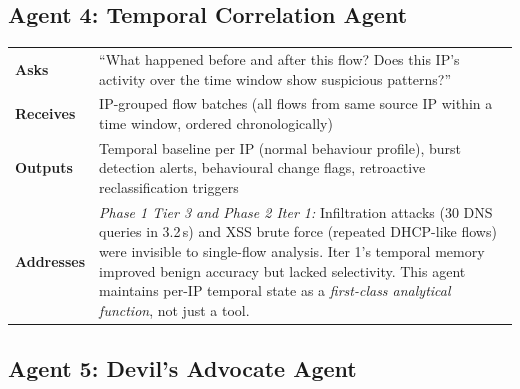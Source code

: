 \documentclass[12pt, a4paper, oneside]{report}
\begin{document}
\subsection{Agent 4: Temporal Correlation Agent}

\begin{table}[H]
\centering
\begin{tabular}{@{}lp{10cm}@{}}
\toprule
\textbf{Asks}     & ``What happened before and after this flow? Does this IP's
                     activity over the time window show suspicious patterns?'' \\
\textbf{Receives}  & IP-grouped flow batches (all flows from same source IP
                     within a time window, ordered chronologically) \\
\textbf{Outputs}   & Temporal baseline per IP (normal behaviour profile),
                     burst detection alerts, behavioural change flags,
                     retroactive reclassification triggers \\
\textbf{Addresses} & \emph{Phase 1 Tier 3 and Phase 2 Iter 1:} Infiltration
                     attacks (30 DNS queries in 3.2\,s) and XSS brute force
                     (repeated DHCP-like flows) were invisible to single-flow
                     analysis. Iter 1's temporal memory improved benign accuracy
                     but lacked selectivity. This agent maintains per-IP temporal
                     state as a \emph{first-class analytical function}, not just
                     a tool. \\
\bottomrule
\end{tabular}
\end{table}

\subsection{Agent 5: Devil's Advocate Agent}
\end{document}
